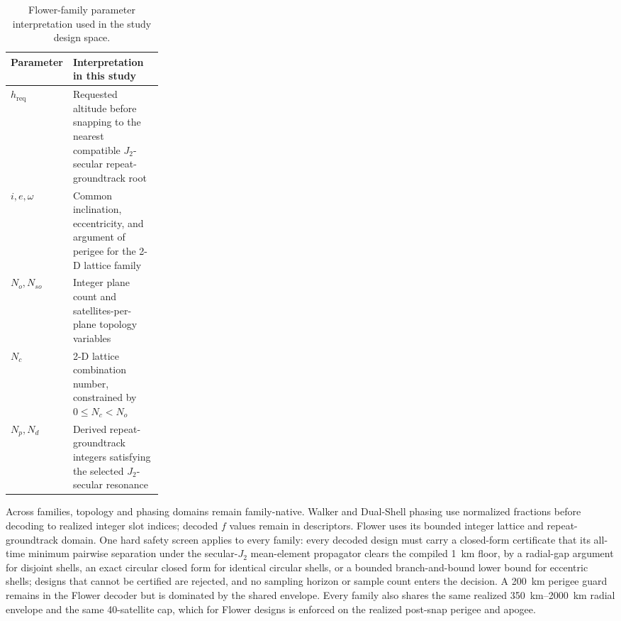         \begin{table}[htb]
            \centering
            \caption[Flower-family parameter interpretation]{Flower-family parameter interpretation used in the study design space.}
            \label{tab:flower_parameter_interpretation}
            \begin{tabularx}{0.90\linewidth}{@{}L{0.25\linewidth}Y@{}}
                \toprule
                Parameter & Interpretation in this study \\
                \midrule
                \(h_{\mathrm{req}}\) & Requested altitude before snapping to the nearest compatible \(J_2\)-secular repeat-groundtrack root \\
                \(i,e,\omega\) & Common inclination, eccentricity, and argument of perigee for the 2-D lattice family \\
                \(N_o,N_{so}\) & Integer plane count and satellites-per-plane topology variables \\
                \(N_c\) & 2-D lattice combination number, constrained by \(0 \leq N_c < N_o\) \\
                \(N_p,N_d\) & Derived repeat-groundtrack integers satisfying the selected \(J_2\)-secular resonance \\
                \bottomrule
            \end{tabularx}
        \end{table}

        Across families, topology and phasing domains remain family-native. Walker and Dual-Shell phasing use normalized fractions before decoding to realized integer slot indices; decoded \(f\) values remain in descriptors. Flower uses its bounded integer lattice and repeat-groundtrack domain. One hard safety screen applies to every family: every decoded design must carry a closed-form certificate that its all-time minimum pairwise separation under the secular-\(J_2\) mean-element propagator clears the compiled \SI{1}{\kilo\metre} floor, by a radial-gap argument for disjoint shells, an exact circular closed form for identical circular shells, or a bounded branch-and-bound lower bound for eccentric shells; designs that cannot be certified are rejected, and no sampling horizon or sample count enters the decision. A \SI{200}{\kilo\metre} perigee guard remains in the Flower decoder but is dominated by the shared envelope. Every family also shares the same realized \SIrange{350}{2000}{\kilo\metre} radial envelope and the same 40-satellite cap, which for Flower designs is enforced on the realized post-snap perigee and apogee.


